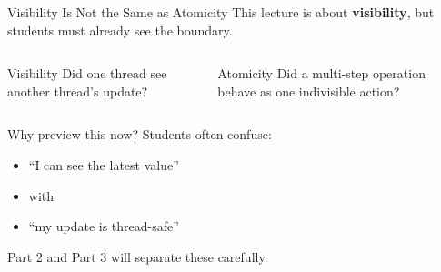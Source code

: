 \documentclass[aspectratio=169,11pt]{beamer}
\begin{document}
	\begin{frame}{Visibility Is Not the Same as Atomicity}
		This lecture is about \textbf{visibility}, but students must already see the boundary.
		
		\vspace{0.3cm}
		
		\begin{columns}[T]
			\begin{block}{Visibility}
				Did one thread see another thread's update?
			\end{block}
			
			\begin{block}{Atomicity}
				Did a multi-step operation behave as one indivisible action?
			\end{block}
		\end{columns}
		
		\vspace{0.35cm}
		
		\begin{exampleblock}{Why preview this now?}
			Students often confuse:
			\begin{itemize}
				\item ``I can see the latest value''
				\item with
				\item ``my update is thread-safe''
			\end{itemize}
		\end{exampleblock}
		
		\vspace{0.2cm}
		
		Part 2 and Part 3 will separate these carefully.
	\end{frame}
	
\end{document}

